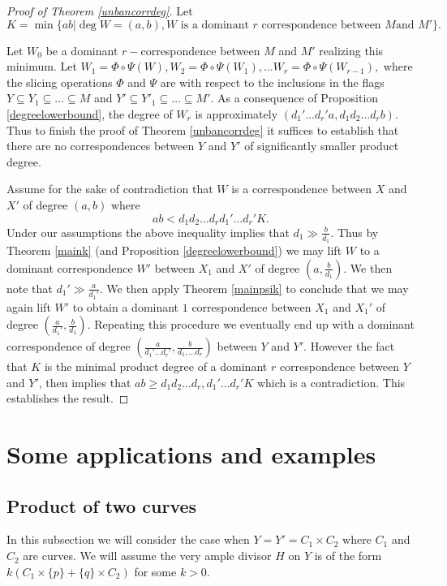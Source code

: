 \documentclass[12pt]{amsart}
\numberwithin{equation}{section}
\numberwithin{theorem}{section}
\theoremstyle{definition}
\theoremstyle{definition}
\begin{document}
\begin{proof}[Proof of Theorem \ref{unbancorrdeg}]
    Let $$K = \min \{ab| \deg W = (a,b), W\textrm { is a dominant } r \textrm{ correspondence between } M \textrm {and }M'\}.$$

    Let $W_0$ be a dominant $r-$correspondence between $M$ and $M'$ realizing this minimum. Let $W_1 = \Phi \circ \Psi (W), W_2 = \Phi \circ \Psi (W_1), \dots W_r = \Phi \circ \Psi (W_{r-1}),$ where  the slicing operations $\Phi$ and $\Psi$ are with respect to the inclusions in the flags $Y \subseteq Y_1 \subseteq \dots \subseteq M$ and $Y' \subseteq Y'_1 \subseteq \dots \subseteq M'.$  As a consequence of Proposition \ref{degreelowerbound}, the degree of $W_r$ is approximately $(d_1' \dots d_r' a,d_1d_2 \dots d_r b).$ Thus to finish the proof of Theorem \ref{unbancorrdeg} it suffices to establish that there are no correspondences between $Y$ and $Y'$ of significantly smaller product degree. 
    
    
     Assume for the sake of contradiction that $W$ is a correspondence between $X$ and $X'$ of degree $(a,b)$ where $$ab < d_1 d_2 \dots d_r d_1' \dots d_r' K .$$ Under our assumptions the above inequality implies that  $d_1 \gg \frac{b}{d_1}$.
      Thus by Theorem \ref{maink} (and Proposition \ref{degreelowerbound}) we may lift $W$ to a dominant correspondence $W'$ between $X_1$ and $X'$ of degree $(a, \frac{b}{d_1}).$ We then note that $d_1' \gg \frac{a}{d_1'}$.
       We then apply Theorem \ref{mainpsik} to conclude that we may again lift $W'$ to obtain a dominant $1$ correspondence between $X_1$ and $X_1'$ of degree $(\frac{a}{d_1'}, \frac{b}{d_1}).$ Repeating this procedure we eventually end up with a dominant correspondence of degree $(\frac{a}{d_1' \dots d_r'}, \frac{b}{d_1,\dots d_r})$ between $Y$ and $Y'$. However the fact that $K$ is the minimal product degree of a dominant $r$ correspondence between $Y$ and $Y'$, then implies that $ab \ge d_1 d_2 \dots d_r, d_1' \dots d_r' K $ which is a contradiction. This establishes the result.
\end{proof}
\section{Some applications and examples} \label{Prod}
\subsection{Product of two curves}
In this subsection we will consider the case when $Y = Y' = C_1 \times C_2$ where $C_1$ and $C_2$ are curves. We will assume the very ample divisor $H$ on $Y$ is of the form $k( C_1 \times \{p\} + \{q\} \times C_2)$ for some $k >0$.
\end{document}
